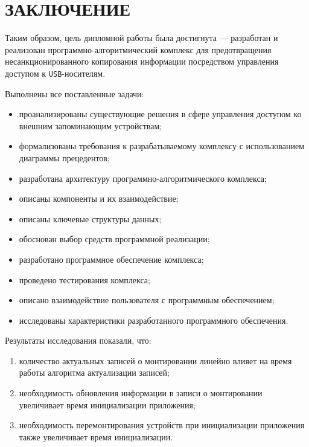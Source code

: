 \chapter*{ЗАКЛЮЧЕНИЕ}

Таким образом, цель дипломной работы была достигнута --- разработан и реализован программно-алгоритмический
комплекс для предотвращения несанкционированного копирования информации посредством управления доступом к \texttt{USB}-носителям.

Выполнены все поставленные задачи:
\begin{itemize}[label=---]
    \item проанализированы существующие решения в сфере управления доступом ко внешним запоминающим устройствам;
    \item формализованы требования к разрабатываемому комплексу с использованием диаграммы прецедентов;
    \item разработана архитектуру программно-алгоритмического комплекса;
    \item описаны компоненты и их взаимодействие;
    \item описаны ключевые структуры данных;
    \item обоснован выбор средств программной реализации;
    \item разработано программное обеспечение комплекса;
    \item проведено тестирования комплекса;
    \item описано взаимодействие пользователя с программным обеспечением;
    \item исследованы характеристики разработанного программного обеспечения.
\end{itemize}

Результаты исследования показали, что:

\begin{enumerate}
    \item количество актуальных записей о монтировании линейно влияет на время работы алгоритма актуализации записей;
    \item необходимость обновления информации в записи о монтировании увеличивает время инициализации приложения;
    \item необходимость перемонтирования устройств при инициализации приложения также увеличивает время инициализации.
\end{enumerate}